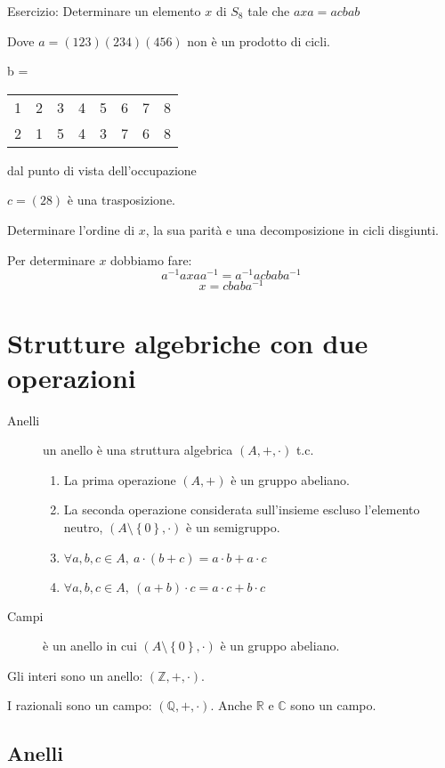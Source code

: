 Esercizio:
Determinare un elemento $x$ di $S_8$ tale che $a x a = a c b a b$

Dove $a = (1 2 3) (2 3 4) (4 5 6)$
non \`e un prodotto di cicli.

b = 

\begin{tabular}{*{8}{c}}
1 & 2 & 3 & 4 & 5 & 6 & 7 & 8 \\
2 & 1 & 5 & 4 & 3 & 7 & 6 & 8
\end{tabular}

dal punto di vista dell'occupazione

$c = (2 8)$
\`e una trasposizione.

Determinare l'ordine di $x$, la sua parit\`a e una decomposizione in cicli disgiunti.

Per determinare $x$ dobbiamo fare:
\[
a^{-1} a x a a^{-1} = a^{-1} a c b a b a^{-1}
\]
\[
x = c b a b a^{-1}
\]

\section{Strutture algebriche con due operazioni}

\begin{description}
    \item[Anelli] un anello \`e una struttura algebrica $(A, +, \cdot)$ t.c. 
    \begin{enumerate}
        \item La prima operazione $\left( A, + \right )$ \`e un gruppo abeliano.
        \item La seconda operazione considerata sull'insieme escluso l'elemento neutro, $(A \setminus \left \{ 0 \right \}, \cdot )$ \`e un semigruppo.
        \item $ \forall a, b, c \in A , \ a \cdot (b + c) = a \cdot b + a \cdot c $
        \item $ \forall a, b, c \in A , \ (a + b) \cdot c = a \cdot c + b \cdot c $
    \end{enumerate}
    \item[Campi] \`e un anello in cui $( A \setminus \left \{ 0 \right \}, \cdot )$ \`e un gruppo abeliano.
\end{description}

Gli interi sono un anello: $\left ( \mathbb{Z}, +, \cdot \right )$.

I razionali sono un campo: $\left ( \mathbb{Q}, +, \cdot \right )$. Anche $\mathbb{R}$ e $\mathbb{C}$ sono un campo.

\subsection{Anelli}

